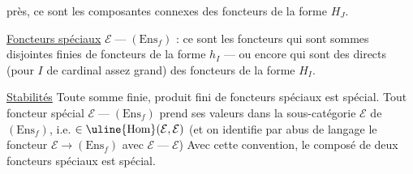 près, ce sont les composantes connexes des
foncteurs de la forme $H_J$.

\uline{Foncteurs spéciaux} $\mathcal E\mathbin{\text{---}}(\mathrm{Ens}_f)$ : ce sont les
foncteurs qui sont  sommes disjointes finies
de foncteurs de la forme $h_I$ --- ou encore
qui sont des  directs
(pour $I$ de cardinal assez grand) des
foncteurs de la forme $H_I$.

\uline{Stabilités} Toute somme finie,  produit
fini  de foncteurs spéciaux est spécial.
Tout foncteur spécial $\mathcal E\mathbin{\text{---}}(\mathrm{Ens}_f)$ prend
ses valeurs dans la sous-catégorie
$\mathcal E$ de $(\mathrm{Ens}_f)$, i.e.  $\in\uline{\operatorname{Hom}}(\mathcal E,\mathcal E)$
(et on identifie par abus de langage
le foncteur $\mathcal E\longrightarrow(\mathrm{Ens}_f)$ avec $\mathcal E\mathbin{\text{---}}\mathcal E$)
Avec cette convention, le composé de
deux foncteurs spéciaux est spécial.
